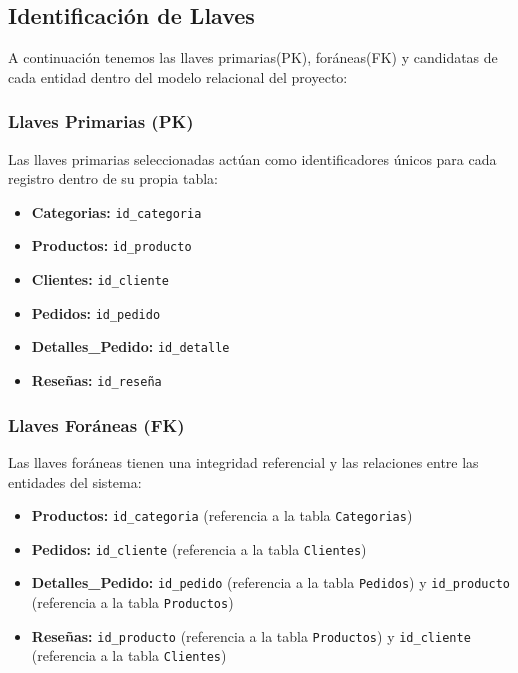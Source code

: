 \documentclass[10pt,letterpaper]{article}
\begin{document}
\subsection{Identificación de Llaves}
A continuación tenemos las llaves primarias(PK), foráneas(FK) y candidatas de cada entidad dentro del modelo relacional del proyecto:

\subsubsection*{Llaves Primarias (PK)}
Las llaves primarias seleccionadas actúan como identificadores únicos  para cada registro dentro de su propia tabla:
\begin{itemize}
    \item \textbf{Categorias:} \texttt{id\_categoria}
    \item \textbf{Productos:} \texttt{id\_producto}
    \item \textbf{Clientes:} \texttt{id\_cliente}
    \item \textbf{Pedidos:} \texttt{id\_pedido}
    \item \textbf{Detalles\_Pedido:} \texttt{id\_detalle}
    \item \textbf{Reseñas:} \texttt{id\_reseña}
\end{itemize}

\subsubsection*{Llaves Foráneas (FK)}
Las llaves foráneas tienen una integridad referencial y las relaciones entre las entidades del sistema:
\begin{itemize}
    \item \textbf{Productos:} \texttt{id\_categoria} (referencia a la tabla \texttt{Categorias})
    \item \textbf{Pedidos:} \texttt{id\_cliente} (referencia a la tabla \texttt{Clientes})
    \item \textbf{Detalles\_Pedido:} \texttt{id\_pedido} (referencia a la tabla \texttt{Pedidos}) y \texttt{id\_producto} (referencia a la tabla \texttt{Productos})
    \item \textbf{Reseñas:} \texttt{id\_producto} (referencia a la tabla \texttt{Productos}) y \texttt{id\_cliente} (referencia a la tabla \texttt{Clientes})
\end{itemize}
\end{document}
